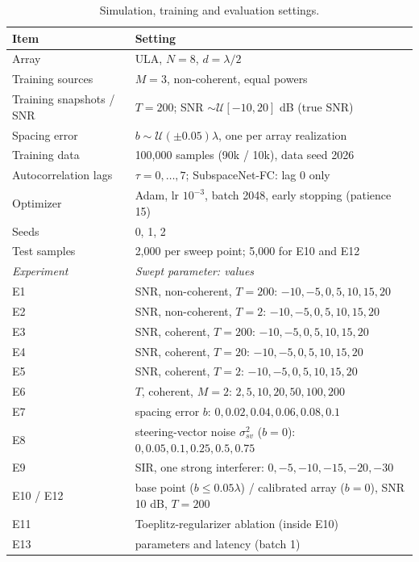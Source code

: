 \begin{table}[h!]
\centering
\small
\caption{Simulation, training and evaluation settings.}
\label{tab:settings}
\begin{tabular}{ll}
\toprule
Item & Setting \\
\midrule
Array & ULA, $N=8$, $d=\lambda/2$ \\
Training sources & $M=3$, non-coherent, equal powers \\
Training snapshots / SNR & $T=200$; SNR $\sim\mathcal{U}[-10,20]$ dB (true SNR) \\
Spacing error & $b\sim\mathcal{U}(\pm0.05)\lambda$, one per array realization \\
Training data & 100,000 samples (90k / 10k), data seed 2026 \\
Autocorrelation lags & $\tau=0,\dots,7$; SubspaceNet-FC: lag 0 only \\
Optimizer & Adam, lr $10^{-3}$, batch 2048, early stopping (patience 15) \\
Seeds & 0, 1, 2 \\
Test samples & 2,000 per sweep point; 5,000 for E10 and E12 \\
\midrule
\textit{Experiment} & \textit{Swept parameter: values} \\
\midrule
E1 & SNR, non-coherent, $T=200$: $-10, -5, 0, 5, 10, 15, 20$ \\
E2 & SNR, non-coherent, $T=2$: $-10, -5, 0, 5, 10, 15, 20$ \\
E3 & SNR, coherent, $T=200$: $-10, -5, 0, 5, 10, 15, 20$ \\
E4 & SNR, coherent, $T=20$: $-10, -5, 0, 5, 10, 15, 20$ \\
E5 & SNR, coherent, $T=2$: $-10, -5, 0, 5, 10, 15, 20$ \\
E6 & $T$, coherent, $M=2$: $2, 5, 10, 20, 50, 100, 200$ \\
E7 & spacing error $b$: $0, 0.02, 0.04, 0.06, 0.08, 0.1$ \\
E8 & steering-vector noise $\sigma^2_{sv}$ ($b=0$): $0, 0.05, 0.1, 0.25, 0.5, 0.75$ \\
E9 & SIR, one strong interferer: $0, -5, -10, -15, -20, -30$ \\
E10 / E12 & base point ($b\le0.05\lambda$) / calibrated array ($b=0$), SNR 10 dB, $T=200$ \\
E11 & Toeplitz-regularizer ablation (inside E10) \\
E13 & parameters and latency (batch 1) \\
\hline
\end{tabular}
\end{table}
